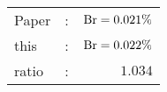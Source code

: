       \begin{tabular}{lcr}
          Paper &:& $\mathrm{Br}  = 0.021\%$ \\
          this      &:& $\mathrm{Br}  = 0.022\%$ \\
		  ratio   &:& $1.034$ \\
      \end{tabular}
